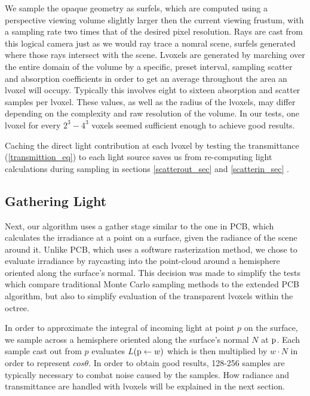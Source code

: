 \documentclass[runningheads]{llncs}
\begin{document}
We sample the opaque geometry as surfels, which are computed using a perspective viewing volume slightly larger then the current viewing frustum, with a sampling rate two times that of the desired pixel resolution.  Rays are cast from this logical camera just as we would ray trace a nomral scene, surfels generated where those rays intersect with the scene.  Lvoxels are generated by marching over the entire domain of the volume by a specific, preset interval, sampling scatter and absorption coefficients in order to get an average throughout the area an lvoxel will occupy.  Typically this involves eight to sixteen absorption and scatter samples per lvoxel.  These values, as well as the radius of the lvoxels, may differ depending on the complexity and raw resolution of the volume.  In our tests, one lvoxel for every $2^3 - 4^3$ voxels seemed sufficient enough to achieve good results.

Caching the direct light contribution at each lvoxel by testing the transmittance (\ref{transmittion_eq}) to each light source saves us from re-computing light calculations during sampling in sections \ref{scatterout_sec} and \ref{scatterin_sec} \cite{signotes:2010}.


\subsection{Gathering Light}
\label{gather_sec}

Next, our algorithm uses a gather stage similar to the one in PCB, which calculates the irradiance at a point on a surface, given the radiance of the scene around it.  Unlike PCB, which uses a software rasterization method, we chose to evaluate irradiance by raycasting into the point-cloud around a hemisphere oriented along the surface's normal.  This decision was made to simplify the tests which compare traditional Monte Carlo sampling methods to the extended PCB algorithm, but also to simplify evaluation of the transparent lvoxels within the octree.

In order to approximate the integral of incoming light at point $p$ on the surface, we sample across a hemisphere oriented along the surface's normal $N$ at $\textup{p}$.  Each sample cast out from $p$ evaluates $L(\textup{p} \leftarrow w)$ which is then multiplied by $w \cdot N$ in order to represent $cos\theta$.  In order to obtain good results, 128-256 samples are typically necessary to combat noise caused by the samples.  How radiance and transmittance are handled with lvoxels will be explained in the next section.
\end{document}
